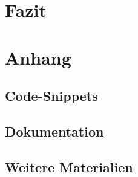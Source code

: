 \chapter{Fazit}

\chapter{Anhang}
\section{Code-Snippets}
\section{Dokumentation}
\section{Weitere Materialien}
